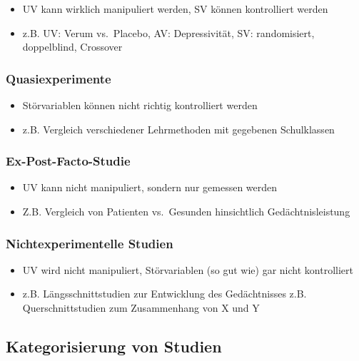 \documentclass[
]{book}
\providecommand{\tightlist}{%
  \setlength{\itemsep}{0pt}\setlength{\parskip}{0pt}}
\begin{document}
\begin{itemize}
\tightlist
\item
  UV kann wirklich manipuliert werden, SV können kontrolliert werden
\item
  z.B. UV: Verum vs.~Placebo, AV: Depressivität, SV: randomisiert, doppelblind, Crossover
\end{itemize}

\hypertarget{quasiexperimente}{%
\subsubsection{Quasiexperimente}\label{quasiexperimente}}

\begin{itemize}
\tightlist
\item
  Störvariablen können nicht richtig kontrolliert werden
\item
  z.B. Vergleich verschiedener Lehrmethoden mit gegebenen Schulklassen
\end{itemize}

\hypertarget{ex-post-facto-studie}{%
\subsubsection{Ex-Post-Facto-Studie}\label{ex-post-facto-studie}}

\begin{itemize}
\tightlist
\item
  UV kann nicht manipuliert, sondern nur gemessen werden
\item
  Z.B. Vergleich von Patienten vs.~Gesunden hinsichtlich Gedächtnisleistung
\end{itemize}

\hypertarget{nichtexperimentelle-studien}{%
\subsubsection{Nichtexperimentelle Studien}\label{nichtexperimentelle-studien}}

\begin{itemize}
\tightlist
\item
  UV wird nicht manipuliert, Störvariablen (so gut wie) gar nicht kontrolliert
\item
  z.B. Längsschnittstudien zur Entwicklung des Gedächtnisses
  z.B. Querschnittstudien zum Zusammenhang von X und Y
\end{itemize}

\hypertarget{kategorisierung-von-studien}{%
\subsection{Kategorisierung von Studien}\label{kategorisierung-von-studien}}
\end{document}
